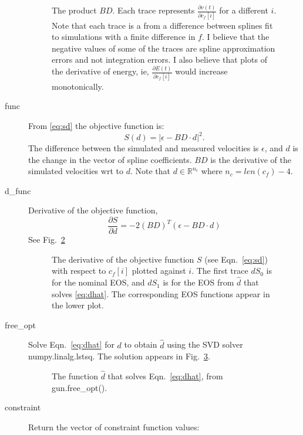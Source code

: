 \documentclass[11pt]{article}
\newcommand{\field}[1]{\mathbb{#1}}
\newcommand\REAL{\field{R}}
\newcommand{\partiald}[2]{\frac{\partial #1}{\partial #2}}
\newcommand\cf{c_f}
\begin{document}
\begin{description}
\begin{figure}
    \caption{The product $B D$.  Each trace represents
      $\frac{\partial v(t)}{\partial c_f[i]}$ for a different $i$.
      Note that each trace is a from a difference between splines fit
      to simulations with a finite difference in $f$.  I believe that
      the negative values of some of the traces are spline
      approximation errors and not integration errors.  I also believe
      that plots of the derivative of energy, ie,
      $\frac{\partial E(t)}{\partial c_f[i]}$ would increase
      monotonically.}
    \label{fig:BD_test}
  \end{figure}
\item[func] From \eqref{eq:sd} the objective function is:
  \begin{equation*}
    S(d) = \left| \epsilon - BD\cdot d \right|^2.
  \end{equation*}
  The difference between the simulated and measured velocities is
  $\epsilon$, and $d$ is the change in the vector of spline
  coefficients.  $BD$ is the derivative of the simulated velocities
  wrt to $d$.  Note that $d\in \REAL^{n_c}$ where $n_c = len(c_f)-4$.
\item[d\_func] Derivative of the objective function,
  \begin{equation*}
    \partiald{S}{d} = -2(BD)^T(\epsilon - BD\cdot d)
  \end{equation*}
  See Fig.~\ref{fig:d_func_test}
  \begin{figure}
    \centering
    \caption{The derivative of the objective function $S$ (see
      Eqn.~\eqref{eq:sd}) with respect to $\cf[i]$ plotted against
      $i$.  The first trace $dS_0$ is for the nominal EOS, and $dS_1$
      is for the EOS from $\hat d$ that solves \eqref{eq:dhat}.  The
      corresponding EOS functions appear in the lower plot.}
    \label{fig:d_func_test}
  \end{figure}
\item[free\_opt] Solve Eqn.~\eqref{eq:dhat} for $d$ to obtain $\hat d$
  using the SVD solver numpy.linalg.lstsq.  The solution appears in
  Fig.~\ref{fig:d_hat_test}.
  \begin{figure}
    \centering
    \caption{The function $\hat d$ that solves Eqn.~\eqref{eq:dhat},
      from gun.free\_opt().}
    \label{fig:d_hat_test}
  \end{figure}
\item[constraint] Return the vector of constraint function values:

\end{description}
\end{document}
